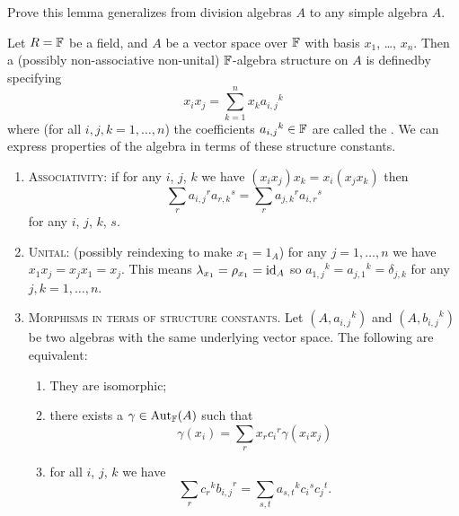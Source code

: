 \begin{xca}[Pierce]
Prove this lemma generalizes from division algebras $A$ to any simple
algebra $A$.
\end{xca}

\begin{example}
Let $R=\mathbb{F}$ be a field, and $A$ be a vector space over $\mathbb{F}$ with
basis $x_{1}$, \dots, $x_{n}$. Then a (possibly non-associative
non-unital) $\mathbb{F}$-algebra structure on $A$ is definedby specifying
\begin{equation}
x_{i}x_{j}=\sum^{n}_{k=1}x_{k}{a_{i,j}}^{k}
\end{equation}
where (for all $i,j,k=1,\dots,n$) the coefficients
${a_{i,j}}^{k}\in\mathbb{F}$ are called the 
. We can express properties of the algebra
in terms of these structure constants.
\begin{enumerate}
\item\textsc{Associativity}: if for any $i$, $j$, $k$ we have $(x_{i}x_{j})x_{k}=x_{i}(x_{j}x_{k})$
  then
  \begin{equation}
\sum_{r}{a_{i,j}}^{r}{a_{r,k}}^{s}=\sum_{r}{a_{j,k}}^{r}{a_{i,r}}^{s}
  \end{equation}
  for any $i$, $j$, $k$, $s$.
\item\textsc{Unital}: (possibly reindexing to make $x_{1}=1_{A}$) for
  any $j=1,\dots,n$ we have $x_{1}x_{j}=x_{j}x_{1}=x_{j}$. This means
  $\lambda_{x_{1}}=\rho_{x_{1}}=\operatorname{id}_{A}$ so ${a_{1,j}}^{k}={a_{j,1}}^{k}=\delta_{j,k}$
  for any $j,k=1,\dots,n$.
\item\textsc{Morphisms in terms of structure constants}. Let
  $(A,{a_{i,j}}^{k})$ and $(A,{b_{i,j}}^{k})$ be two algebras with the
  same underlying vector space. The following are equivalent:
\begin{enumerate}
\item They are isomorphic;
\item there exists a $\gamma\in\operatorname{Aut}_{\mathbb{F}}(A)$ such that
\begin{equation}
\gamma(x_{i})=\sum_{r}x_{r}{c_{i}}^{r}\gamma(x_{i}x_{j})
\end{equation}
\item for all $i$, $j$, $k$ we have
  \begin{equation}
\sum_{r}{c_{r}}^{k}{b_{i,j}}^{r}=\sum_{s,t}{a_{s,t}}^{k}{c_{i}}^{s}{c_{j}}^{t}.
  \end{equation}
\end{enumerate}
\end{enumerate}
\end{example}

